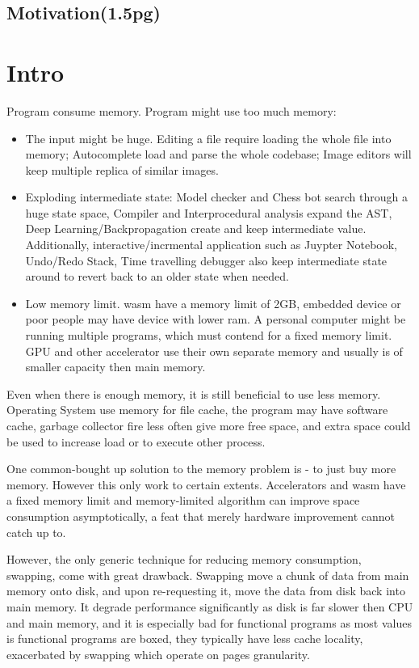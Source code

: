 \subsection{Motivation(1.5pg)}
\section{Intro}
Program consume memory. Program might use too much memory:
\begin{itemize}
	\item The input might be huge. Editing a file require loading the whole file into memory; Autocomplete load and parse the whole codebase; Image editors will keep multiple replica of similar images.
	\item Exploding intermediate state: Model checker and Chess bot search through a huge state space, Compiler and Interprocedural analysis expand the AST, Deep Learning/Backpropagation create and keep intermediate value. Additionally, interactive/incrmental application such as Juypter Notebook, Undo/Redo Stack, Time travelling debugger also keep intermediate state around to revert back to an older state when needed.
	\item Low memory limit. wasm have a memory limit of 2GB, embedded device or poor people may have device with lower ram. A personal computer might be running multiple programs, which must contend for a fixed memory limit. GPU and other accelerator use their own separate memory and usually is of smaller capacity then main memory.
\end{itemize}

Even when there is enough memory, it is still beneficial to use less memory. Operating System use memory for file cache, the program may have software cache, garbage collector fire less often give more free space, and extra space could be used to increase load or to execute other process.

One common-bought up solution to the memory problem is - to just buy more memory. However this only work to certain extents. Accelerators and wasm have a fixed memory limit and memory-limited algorithm can improve space consumption asymptotically, a feat that merely hardware improvement cannot catch up to. 

However, the only generic technique for reducing memory consumption, swapping, come with great drawback. Swapping move a chunk of data from main memory onto disk, and upon re-requesting it, move the data from disk back into main memory. It degrade performance significantly as disk is far slower then CPU and main memory, and it is especially bad for functional programs as most values is functional programs are boxed, they typically have less cache locality, exacerbated by swapping which operate on pages granularity.

